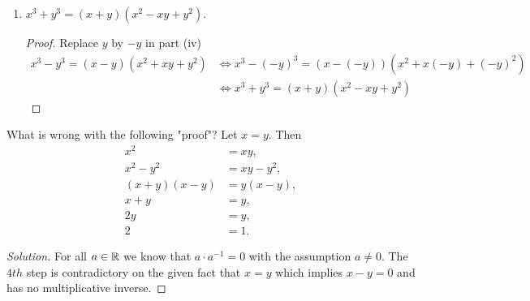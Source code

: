 \begin{exercise}[\textbf{1}]
\begin{enumerate}
\begin{proof}[Alternative Proof]
        \end{proof}
        \item $x^3+y^3 = (x+y)(x^2-xy+y^2).$
        \begin{proof} Replace $y$ by $-y$ in part (iv)
             \begin{align*}
                x^3-y^3 = (x-y)(x^2+xy+y^2) & \Leftrightarrow x^3-(-y)^3 = (x-(-y))(x^2+x(-y)+(-y)^2) \\
                & \Leftrightarrow x^3+y^3 = (x+y)(x^2-xy+y^2)
             \end{align*}
        \end{proof}
    \end{enumerate}
\end{exercise}

\begin{exercise}[\textbf{2}]
     What is wrong with the following "proof"? Let $x=y$. Then
     \begin{align*}
         x^2 &= xy, \\
         x^2-y^2 &= xy-y^2, \\
         (x+y)(x-y) &= y(x-y), \\
         x+y &= y, \\
         2y &= y, \\ 
         2 &= 1.    
     \end{align*}
     \begin{proof}[Solution] For all $a \in \mathbb{R}$ we know that $a\cdot a^{-1}=0$
     with the assumption $a\neq 0$. The $4th$ step is contradictory on the given
     fact that $x=y$ which implies $x-y=0$ and has no multiplicative inverse.
    \end{proof}
\end{exercise}
